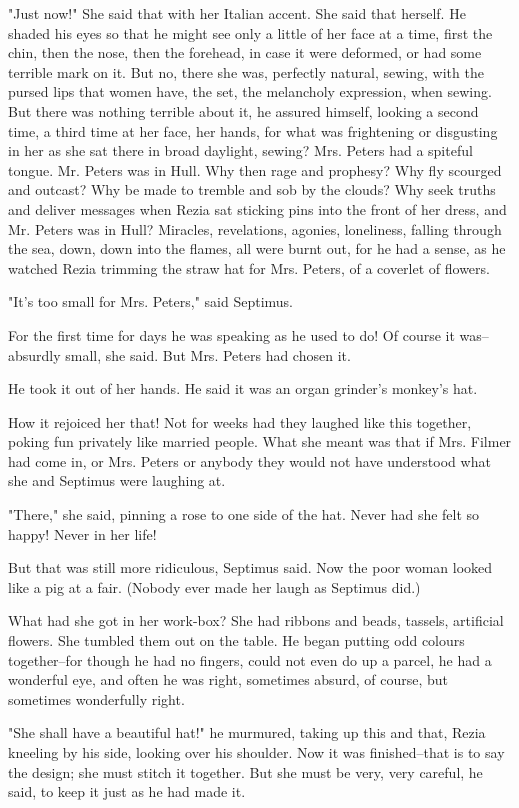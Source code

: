 \documentclass[lang=cn,10pt]{elegantbook}
\begin{document}
"Just now!"  She said that with her Italian accent.  She said that
herself.  He shaded his eyes so that he might see only a little of
her face at a time, first the chin, then the nose, then the
forehead, in case it were deformed, or had some terrible mark on
it.  But no, there she was, perfectly natural, sewing, with the
pursed lips that women have, the set, the melancholy expression,
when sewing.  But there was nothing terrible about it, he assured
himself, looking a second time, a third time at her face, her
hands, for what was frightening or disgusting in her as she sat
there in broad daylight, sewing?  Mrs. Peters had a spiteful
tongue.  Mr. Peters was in Hull.  Why then rage and prophesy?  Why
fly scourged and outcast?  Why be made to tremble and sob by the
clouds?  Why seek truths and deliver messages when Rezia sat
sticking pins into the front of her dress, and Mr. Peters was in
Hull?  Miracles, revelations, agonies, loneliness, falling through
the sea, down, down into the flames, all were burnt out, for he had
a sense, as he watched Rezia trimming the straw hat for Mrs.
Peters, of a coverlet of flowers.

"It's too small for Mrs. Peters," said Septimus.

For the first time for days he was speaking as he used to do!  Of
course it was--absurdly small, she said.  But Mrs. Peters had
chosen it.

He took it out of her hands.  He said it was an organ grinder's
monkey's hat.

How it rejoiced her that!  Not for weeks had they laughed like this
together, poking fun privately like married people.  What she meant
was that if Mrs. Filmer had come in, or Mrs. Peters or anybody they
would not have understood what she and Septimus were laughing at.

"There," she said, pinning a rose to one side of the hat.  Never
had she felt so happy!  Never in her life!

But that was still more ridiculous, Septimus said.  Now the poor
woman looked like a pig at a fair.  (Nobody ever made her laugh as
Septimus did.)

What had she got in her work-box?  She had ribbons and beads,
tassels, artificial flowers.  She tumbled them out on the table.
He began putting odd colours together--for though he had no
fingers, could not even do up a parcel, he had a wonderful eye, and
often he was right, sometimes absurd, of course, but sometimes
wonderfully right.

"She shall have a beautiful hat!" he murmured, taking up this and
that, Rezia kneeling by his side, looking over his shoulder.  Now
it was finished--that is to say the design; she must stitch it
together.  But she must be very, very careful, he said, to keep it
just as he had made it.
\end{document}
